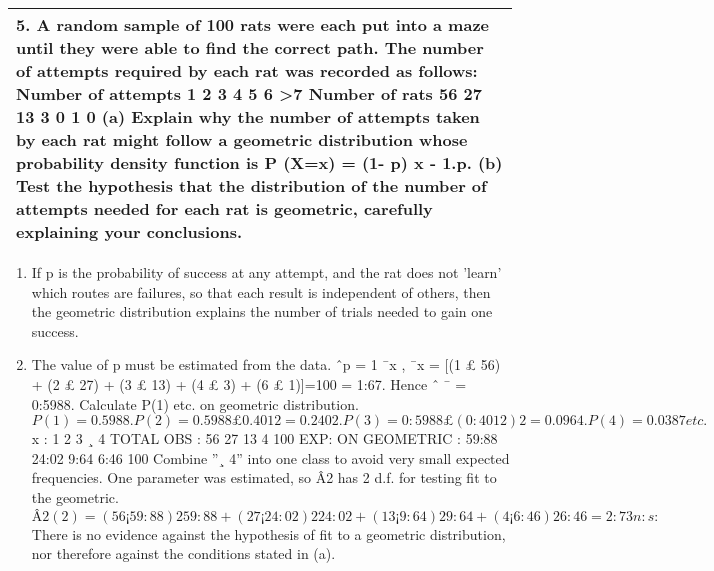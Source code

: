 \documentclass[a4paper,12pt]{article}
\begin{document}
\begin{table}[ht!]
 
\centering
 
\begin{tabular}{|p{15cm}|}
 
\hline  

5. A random sample of 100 rats were each put into a maze until they were able to find the correct path.  The number of attempts required by each rat was recorded as follows:
Number of attempts 1 2 3 4 5 6 >7
Number of rats 56 27 13 3 0 1 0
(a) Explain why the number of attempts taken by each rat might follow a geometric distribution whose probability density function is P (X=x) = (1- p) x - 1.p.
(b) Test the hypothesis that the distribution of the number of attempts needed for each rat is geometric, carefully explaining your conclusions.


\\ \hline
  
\end{tabular}

\end{table}


\begin{enumerate}
\item If p is the probability of success at any attempt, and the rat does not ’learn’ which routes are
failures, so that each result is independent of others, then the geometric distribution explains the
number of trials needed to gain one success.
\item The value of p must be estimated from the data.
ˆp = 1
¯x , ¯x = [(1 £ 56) + (2 £ 27) + (3 £ 13) + (4 £ 3) + (6 £ 1)]=100 = 1:67.
Hence ˆ ¯ = 0:5988. Calculate P(1) etc. on geometric distribution.
\[P(1)=0.5988 . P(2)=0.5988£0.4012=0.2402 .
P(3)=0:5988 £ (0:4012)2=0.0964 . P(4)=0.0387 etc.\]
x : 1 2 3 ¸ 4 TOTAL
OBS : 56 27 13 4 100
EXP: ON GEOMETRIC : 59:88 24:02 9:64 6:46 100
Combine ”¸ 4” into one class to avoid very small expected frequencies. One parameter was
estimated, so Â2 has 2 d.f. for testing fit to the geometric.
\[Â2
(2) =
(56 ¡ 59:88)2
59:88
+
(27 ¡ 24:02)2
24:02
+
(13 ¡ 9:64)2
9:64
+
(4 ¡ 6:46)2
6:46
= 2:73 n:s:\]
There is no evidence against the hypothesis of fit to a geometric distribution, nor therefore against
the conditions stated in (a).
\end{enumerate}
\end{document}
